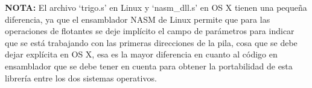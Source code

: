 {\bfseries NOTA:} El archivo `trigo.s' en Linux y `nasm\_dll.s' en OS X tienen una pequeña diferencia, ya que el ensamblador NASM de Linux permite que para las operaciones de flotantes se deje implícito el campo de parámetros para indicar que se está trabajando con las primeras direcciones de la pila, cosa que se debe dejar explícita en OS X, esa es la mayor diferencia en cuanto al código en ensamblador que se debe tener en cuenta para obtener la portabilidad de esta librería entre los dos sistemas operativos.

%
